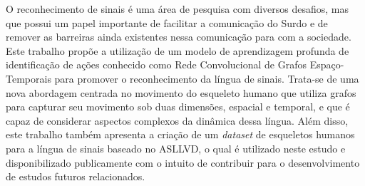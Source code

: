 O reconhecimento de sinais é uma área de pesquisa com diversos desafios, mas que possui um papel importante de facilitar a comunicação do Surdo e de remover as barreiras ainda existentes nessa comunicação para com a sociedade. Este trabalho propõe a utilização de um modelo de aprendizagem profunda de identificação de ações conhecido como Rede Convolucional de Grafos Espaço-Temporais para promover o reconhecimento da língua de sinais. Trata-se de uma nova abordagem centrada no movimento do esqueleto humano que utiliza grafos para capturar seu movimento sob duas dimensões, espacial e temporal, e que é capaz de considerar aspectos complexos da dinâmica dessa língua. Além disso, este trabalho também apresenta a criação de um \textit{dataset} de esqueletos humanos para a língua de sinais baseado no ASLLVD, o qual é utilizado neste estudo e disponibilizado publicamente com o intuito de contribuir para o desenvolvimento de estudos futuros relacionados.